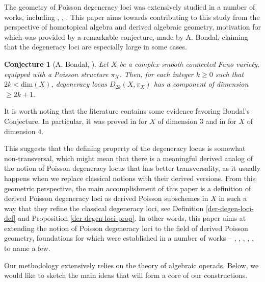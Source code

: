 \documentclass[10pt, oneside]{amsart}
\theoremstyle{plain}
\newtheorem{conjecture}[equation]{Conjecture}
\begin{document}
The geometry of Poisson degeneracy loci was extensively studied in a number of works, including \cite{Bondal}, \cite{Pol}, \cite{PG}.
This paper aims towards contributing to this study from the perspective of homotopical algebra and derived algebraic geometry, 
motivation for which was provided
by a remarkable conjecture, made by A. Bondal, claiming that the degeneracy loci are especially large in some cases.
\begin{conjecture}[A. Bondal, \cite{Bondal}]\label{conj-bondal}
Let $X$ be a complex smooth connected Fano variety, equipped with a Poisson structure $\pi_X$.
Then, for each integer $k \ge 0$ such that $2k < \mathrm{dim}(X)$, degeneracy locus $D_{2k}(X, \pi_X)$ has a component of
dimension $\ge 2k+1$.
\end{conjecture}
It is worth noting that the literature contains some evidence favoring Bondal's Conjecture. In particular, it was proved in 
\cite{Bondal} for $X$ of dimension $3$ and in \cite{PG} for $X$ of dimension $4$.

This suggests that the defining property of the degeneracy locus is somewhat non-transversal, which might mean that there is a
meaningful derived analog of the notion of Poisson degeneracy locus that has better transversality, as it usually happens when
we replace classical notions with their derived versions. From this geometric perspective, the main accomplishment of this paper
is a definition of derived Poisson degeneracy loci as derived Poisson subschemes in $X$ in such a way that they refine the
classical degeneracy loci, see Definition \ref{der-degen-loci-def} and Proposition \ref{der-degen-loci-prop}. In other words,
this paper aims at extending the notion of Poisson degeneracy loci to the field of derived Poisson geometry, foundations for
which were established in a number of works -- \cite{PTVV}, \cite{Melani}, \cite{CPTVV}, \cite{Melani_2018}, \cite{Melani_20181},
to name a few.

Our methodology extensively relies on the theory of algebraic operads. Below, we would like to sketch the main ideas
that will form a core of our constructions.
\end{document}
